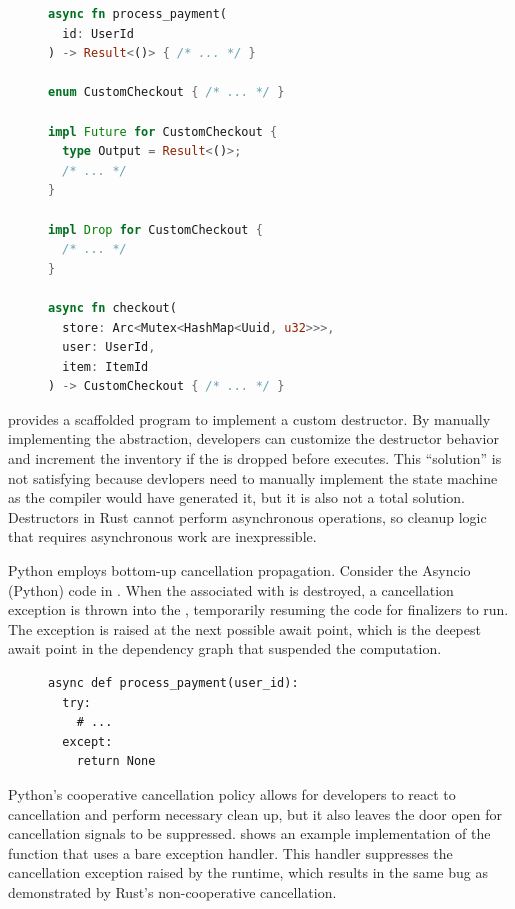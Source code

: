 \begin{figure}
\begin{lstlisting}[language=Rust]
async fn process_payment(
  id: UserId
) -> Result<()> { /* ... */ }

enum CustomCheckout { /* ... */ }

impl Future for CustomCheckout {
  type Output = Result<()>;
  /* ... */
}

impl Drop for CustomCheckout {
  /* ... */
}

async fn checkout(
  store: Arc<Mutex<HashMap<Uuid, u32>>>,
  user: UserId,
  item: ItemId
) -> CustomCheckout { /* ... */ }
\end{lstlisting}
  \cprotect\caption{}
  \label{fig:cancellation:dir:rust}
\end{figure}

 provides a scaffolded program to implement a custom destructor. By manually implementing the \coro abstraction, developers can customize the destructor behavior and increment the inventory if the \coro is dropped before  executes. This ``solution'' is not satisfying because devlopers need to manually implement the state machine as the compiler would have generated it, but it is also not a total solution. Destructors in Rust cannot perform asynchronous operations, so cleanup logic that requires asynchronous work are inexpressible.

Python employs bottom-up cancellation propagation. Consider the Asyncio (Python) code in . When the \coro associated with  is destroyed, a cancellation exception is thrown into the \coro, temporarily resuming the code for finalizers to run. The exception is raised at the next possible await point, which is the deepest await point in the dependency graph that suspended the computation.

\begin{figure}
\begin{lstlisting}[language=Py]
async def process_payment(user_id):
  try:
    # ...
  except:
    return None
\end{lstlisting}
  \cprotect\caption{}
  \label{fig:cancellation:dir:py}
\end{figure}

Python's cooperative cancellation policy allows for developers to react to cancellation and perform necessary clean up, but it also leaves the door open for cancellation signals to be suppressed.  shows an example implementation of the  function that uses a bare exception handler. This handler suppresses the cancellation exception raised by the runtime, which results in the same bug as demonstrated by Rust's non-cooperative cancellation.

